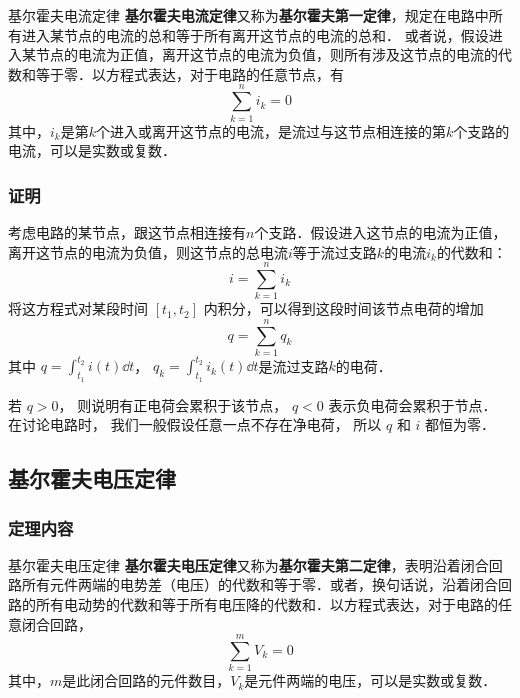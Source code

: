 

\begin{theorem}{基尔霍夫电流定律}
\textbf{基尔霍夫电流定律}又称为\textbf{基尔霍夫第一定律}，规定在电路中所有进入某节点的电流的总和等于所有离开这节点的电流的总和． 或者说，假设进入某节点的电流为正值，离开这节点的电流为负值，则所有涉及这节点的电流的代数和等于零．以方程式表达，对于电路的任意节点，有
\begin{equation}
\sum_{k=1}^n i_k =0
\end{equation}
其中，$i_k$是第$k$个进入或离开这节点的电流，是流过与这节点相连接的第$k$个支路的电流，可以是实数或复数．
\end{theorem}

\subsubsection{证明}
考虑电路的某节点，跟这节点相连接有$n$个支路．假设进入这节点的电流为正值，离开这节点的电流为负值，则这节点的总电流$i$等于流过支路$k$的电流$i_k$的代数和：
\begin{equation}
i=\sum_{k=1}^n i_k
\end{equation}
将这方程式对某段时间 $[t_1, t_2]$ 内积分，可以得到这段时间该节点电荷的增加
\begin{equation}
q=\sum_{k=1}^n q_k
\end{equation}
其中 $q = \int_{t_1}^{t_2} i(t) \dd{t}$， $q_k=\int_{t_1}^{t_2} i_k(t) \dd{t}$是流过支路$k$的电荷．

若 $q>0$， 则说明有正电荷会累积于该节点， $q < 0$ 表示负电荷会累积于节点． 在讨论电路时， 我们一般假设任意一点不存在净电荷， 所以 $q$ 和 $i$ 都恒为零．

\subsection{基尔霍夫电压定律}
\subsubsection{定理内容}
\begin{theorem}{基尔霍夫电压定律}
\textbf{基尔霍夫电压定律}又称为\textbf{基尔霍夫第二定律}，表明沿着闭合回路所有元件两端的电势差（电压）的代数和等于零．或者，换句话说，沿着闭合回路的所有电动势的代数和等于所有电压降的代数和．以方程式表达，对于电路的任意闭合回路，
\begin{equation}
\sum_{k=1}^m V_k = 0
\end{equation}
其中，$m$是此闭合回路的元件数目，$V_k$是元件两端的电压，可以是实数或复数．
\end{theorem}

